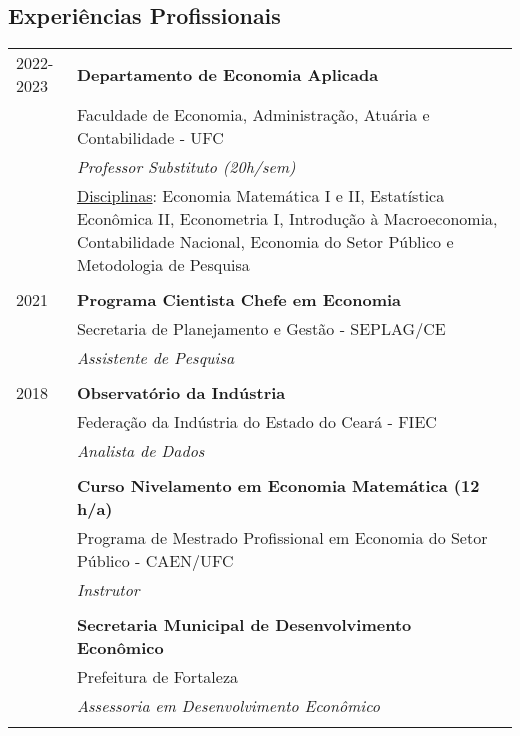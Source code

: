 \documentclass[a4paper,12pt]{article}
\begin{document}
	\subsection*{Experiências Profissionais}
	\setlength{\LTleft}{0pt}
	\begin{longtable}[t]{>{\raggedleft\arraybackslash}p{2.0cm}>{\raggedright\arraybackslash}p{13.5cm}}
		\textsc{2022-2023} & \textbf{Departamento de Economia Aplicada} \\
		& Faculdade de Economia, Administração, Atuária e Contabilidade - UFC \\
		& \textit{Professor Substituto (20h/sem)} \\
		& \underline{Disciplinas}: Economia Matemática I e II, Estatística Econômica II, Econometria I, Introdução à Macroeconomia, Contabilidade Nacional, Economia do Setor Público e Metodologia de Pesquisa \\
		\multicolumn{2}{c}{\vspace{-0.2cm}} \\

		\textsc{2021} & \textbf{Programa Cientista Chefe em Economia} \\
		& Secretaria de Planejamento e Gestão - SEPLAG/CE \\
		& \textit{Assistente de Pesquisa} \\
		\multicolumn{2}{c}{\vspace{-0.2cm}} \\

		\textsc{2018} & \textbf{Observatório da Indústria} \\
		& Federação da Indústria do Estado do Ceará - FIEC \\
		& \textit{Analista de Dados} \\
		\multicolumn{2}{c}{\vspace{-0.2cm}} \\

		2017 & \textbf{Curso Nivelamento em Economia Matemática (12 h/a)} \\
		& Programa de Mestrado Profissional em Economia do Setor Público - CAEN/UFC \\
		& \textit{Instrutor} \\
		\multicolumn{2}{c}{\vspace{-0.2cm}} \\

		2017 & \textbf{Secretaria Municipal de Desenvolvimento Econômico} \\
		& Prefeitura de Fortaleza \\
		& \textit{Assessoria em Desenvolvimento Econômico} \\
		\multicolumn{2}{c}{\vspace{-0.2cm}} \\


\end{longtable}
\end{document}
